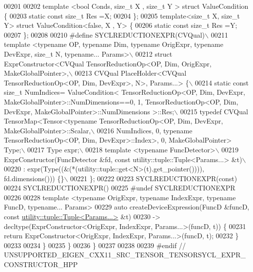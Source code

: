 \begin{DoxyCode}
00201 
00202 \textcolor{keyword}{template} <\textcolor{keywordtype}{bool} Conds,  \textcolor{keywordtype}{size\_t} X , \textcolor{keywordtype}{size\_t} Y > \textcolor{keyword}{struct }ValueCondition \{
00203   \textcolor{keyword}{static} \textcolor{keyword}{const} \textcolor{keywordtype}{size\_t} Res =X;
00204 \};
00205 \textcolor{keyword}{template}<\textcolor{keywordtype}{size\_t} X, \textcolor{keywordtype}{size\_t} Y> \textcolor{keyword}{struct }ValueCondition<false, X , Y> \{
00206   \textcolor{keyword}{static} \textcolor{keyword}{const} \textcolor{keywordtype}{size\_t} Res =Y;
00207 \};
00208 
00210 \textcolor{preprocessor}{#define SYCLREDUCTIONEXPR(CVQual)\(\backslash\)}
00211 \textcolor{preprocessor}{template <typename OP, typename Dim, typename OrigExpr, typename DevExpr, size\_t N, typename... Params>\(\backslash\)}
00212 \textcolor{preprocessor}{struct ExprConstructor<CVQual TensorReductionOp<OP, Dim, OrigExpr, MakeGlobalPointer>,\(\backslash\)}
00213 \textcolor{preprocessor}{CVQual PlaceHolder<CVQual TensorReductionOp<OP, Dim, DevExpr>, N>, Params...> \{\(\backslash\)}
00214 \textcolor{preprocessor}{  static const size\_t NumIndices= ValueCondition< TensorReductionOp<OP, Dim, DevExpr,
       MakeGlobalPointer>::NumDimensions==0,  1, TensorReductionOp<OP, Dim, DevExpr, MakeGlobalPointer>::NumDimensions >::Res;\(\backslash\)}
00215 \textcolor{preprocessor}{  typedef CVQual TensorMap<Tensor<typename TensorReductionOp<OP, Dim, DevExpr, MakeGlobalPointer>::Scalar,\(\backslash\)}
00216 \textcolor{preprocessor}{  NumIndices, 0, typename TensorReductionOp<OP, Dim, DevExpr>::Index>, 0, MakeGlobalPointer> Type;\(\backslash\)}
00217 \textcolor{preprocessor}{  Type expr;\(\backslash\)}
00218 \textcolor{preprocessor}{  template <typename FuncDetector>\(\backslash\)}
00219 \textcolor{preprocessor}{  ExprConstructor(FuncDetector &fd, const utility::tuple::Tuple<Params...> &t)\(\backslash\)}
00220 \textcolor{preprocessor}{  : expr(Type((&(*(utility::tuple::get<N>(t).get\_pointer()))), fd.dimensions())) \{\}\(\backslash\)}
00221 \textcolor{preprocessor}{\};}
00222 
00223 SYCLREDUCTIONEXPR(\textcolor{keyword}{const})
00224 SYCLREDUCTIONEXPR()
00225 \textcolor{preprocessor}{#undef SYCLREDUCTIONEXPR}
00226 
00228 \textcolor{keyword}{template} <\textcolor{keyword}{typename} OrigExpr, \textcolor{keyword}{typename} IndexExpr, \textcolor{keyword}{typename} FuncD, \textcolor{keyword}{typename}... Params>
00229 \textcolor{keyword}{auto} createDeviceExpression(FuncD &funcD, \textcolor{keyword}{const} \hyperlink{structutility_1_1tuple_1_1_tuple}{utility::tuple::Tuple<Params...>}
       &t)
00230     -> decltype(ExprConstructor<OrigExpr, IndexExpr, Params...>(funcD, t)) \{
00231   \textcolor{keywordflow}{return} ExprConstructor<OrigExpr, IndexExpr, Params...>(funcD, t);
00232 \}
00233 
00234 \} 
00235 \} 
00236 \} 
00237 
00238 
00239 \textcolor{preprocessor}{#endif  // UNSUPPORTED\_EIGEN\_CXX11\_SRC\_TENSOR\_TENSORSYCL\_EXPR\_CONSTRUCTOR\_HPP}
\end{DoxyCode}
